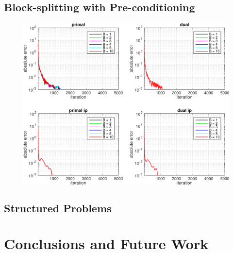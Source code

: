 \documentclass{article}
\begin{document}
\subsection*{Block-splitting with Pre-conditioning}
\begin{figure}[h]
	\includegraphics[width=\textwidth]{../figures/precond_norndperm.png}
	\label{fig:p_nor}
\end{figure}
\subsection*{Structured Problems}


\vspace{0.5in}
\section{Conclusions and Future Work}


\newpage
\vspace{0.4in}
%

\end{document}
